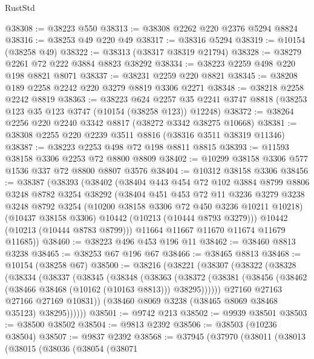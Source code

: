 \begin{lexlean}{RustStd}
\begin{coremodule}
{\begin{coremodule}
{{{{{{{{{{{{{{{{{{{{{{{{{{@38308 := @38223 @550
@38313 := @38308 @2262 @220 @2376 @5294 @8824
@38316 := @38253 @49 @220 @49
@38317 := @38316 @5294
@38319 := @10154 (@38258 @49)
@38322 := @38313 (@38317 @38319 @21794)
@38328 := @38279 @2261 @72 @222 @3884 @8823 @38292
@38334 := @38223 @2259 @498 @220 @198 @8821 @8071
@38337 := @38231 @2259 @220 @8821
@38345 := @38208 @189 @2258 @2242 @220 @3279 @8819 @3306 @2271
@38348 := @38218 @2258 @2242 @8819
@38363 := @38223
    @624
    @2257
    @35
    @2241
    @3747
    @8818
    (@38253 @123 @35 @123 @3747 (@10154 (@38258 @123)) @12248)
@38372 := @38264 @2256 @220 @2240 @3342 @8817 (@38272 @3342 @38275 @10668)
@38381 := @38308 @2255 @220 @2239 @3511 @8816 (@38316 @3511 @38319 @11346)
@38387 := @38223 @2253 @498 @72 @198 @8811 @8815
@38393 := @11593 @38158 @3306 @2253 @72 @8800 @8809
@38402 := @10299 @38158 @3306 @577 @1536 @337 @72 @8800 @8807 @3576
@38404 := @10312 @38158 @3306
@38456 := @38387
    (@38393
      (@38402
        (@38404
          @443
          @454
          @72
          @102
          @3884
          @8799
          @8806
          @3248
          @8782
          @3254
          @38292
          (@38404
            @451
            @453
            @72
            @11
            @3236
            @3279
            @3238
            @3248
            @8792
            @3254
            (@10200 @38158 @3306 @72 @450 @3236 @10211 @10218)
            (@10437 @38158 @3306)
            @10442
            (@10213 (@10444 @8793 @3279)))
          @10442
          (@10213 (@10444 @8783 @8799)))
        @11664
        @11667
        @11670
        @11674
        @11679
        @11685))
@38460 := @38223 @496 @453 @196 @11
@38462 := @38460 @8813 @3238
@38465 := @38253 @67 @196 @67
@38466 := @38465 @8813
@38468 := @10154 (@38258 @67)
@38500 := @38216
    (@38221
      (@38307
        (@38322
          (@38328
            (@38334
              (@38337
                (@38345
                  (@38348
                    (@38363
                      (@38372
                        (@38381 (@38456 (@38462 (@38466 @38468 (@10162 (@10163 @8813))) @38295))))))
                  @27160
                  @27163
                  @27166
                  @27169
                  @10831))
              (@38460 @8069 @3238 (@38465 @8069 @38468 @35123) @38295))))))
@38501 := @9742 @213
@38502 := @9939 @38501
@38503 := @38500 @38502
@38504 := @9813 @2392
@38506 := @38503 (@10236 @38504)
@38507 := @9837 @2392
@38568 := @37945
    (@37970
      (@38011
        (@38013
          (@38015
            (@38036
              (@38054
                (@38071
}}}}}}}}}}}}}}}}}}}}}}}}}}
\end{coremodule}}
\end{coremodule}
\end{lexlean}
